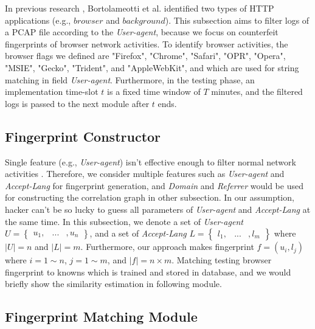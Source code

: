 In previous research \cite{bortolameotti2017decanter}, Bortolameotti et al. identified two types of HTTP applications (e.g., $browser$ and $background$). This subsection aims to filter logs of a PCAP file according to the {\em User-agent}, because we focus on counterfeit fingerprints of browser network activities. To identify browser activities, the browser flags we defined are "Firefox", "Chrome", "Safari", "OPR",  "Opera", "MSIE", "Gecko", "Trident", and "AppleWebKit", and which are used for string matching in field {\em User-agent}. Furthermore, in the testing phase, an implementation time-slot $t$ is a fixed time window of $T$ minutes, and the filtered logs is passed to the next module after $t$ ends.


\subsection{Fingerprint Constructor}

Single feature (e.g., {\em User-agent}) isn't effective enough to filter normal network activities \cite{bortolameotti2017decanter} \cite{kheir2013analyzing}. Therefore, we consider multiple features such as {\em User-agent} and {\em Accept-Lang} for fingerprint generation, and {\em Domain} and {\em Referrer} would be used for constructing the correlation graph in other subsection. In our assumption, hacker can't be so lucky to guess all parameters of {\em User-agent} and {\em Accept-Lang} at the same time. In this subsection, we denote a set of {\em User-agent} $U = \begin{Bmatrix} u_{1}, & ... & , u_{n} \end{Bmatrix}$, and a set of {\em Accept-Lang} $L = \begin{Bmatrix} l_{1}, & ... & , l_{m} \end{Bmatrix}$ where $\left | U \right | = n$ and $\left | L  \right | = m$. Furthermore, our approach makes fingerprint $f = (u_{i}, l_{j})$ where $i = 1 \sim n$, $j = 1 \sim m$, and $\left | f \right | = n \times m $. Matching testing browser fingerprint to knowns which is trained and stored in database, and we would briefly show the similarity estimation in following module.

\subsection{Fingerprint Matching Module}

